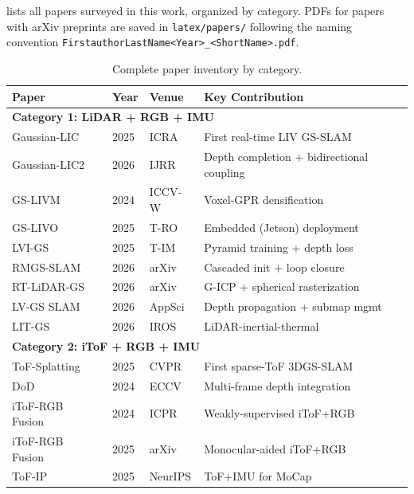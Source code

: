 lists all papers surveyed in this work, organized
by category.  PDFs for papers with arXiv preprints are saved in
\texttt{latex/papers/} following the naming convention
\texttt{FirstauthorLastName<Year>\_<ShortName>.pdf}.

\begin{table}[h]
\centering
\caption{Complete paper inventory by category.}
\label{tab:full_inventory}
\scriptsize
\begin{tabular}{p{4cm}p{2cm}p{2cm}p{5cm}}
\toprule
\textbf{Paper} & \textbf{Year} & \textbf{Venue} & \textbf{Key Contribution} \\
\midrule
\multicolumn{4}{l}{\textbf{Category 1: LiDAR + RGB + IMU}} \\
\midrule
Gaussian-LIC~\cite{lang2025_gaussianlic} & 2025 & ICRA & First real-time LIV GS-SLAM \\
Gaussian-LIC2~\cite{lang2026_gaussianlic2} & 2026 & IJRR & Depth completion + bidirectional coupling \\
GS-LIVM~\cite{xie2024_gslivm} & 2024 & ICCV-W & Voxel-GPR densification \\
GS-LIVO~\cite{hong2025_gslivo} & 2025 & T-RO & Embedded (Jetson) deployment \\
LVI-GS~\cite{zhao2025_lvigs} & 2025 & T-IM & Pyramid training + depth loss \\
RMGS-SLAM~\cite{li2026_rmgs} & 2026 & arXiv & Cascaded init + loop closure \\
RT-LiDAR-GS~\cite{tak2026_realtimelidar} & 2026 & arXiv & G-ICP + spherical rasterization \\
LV-GS SLAM~\cite{he2026lvgsslam} & 2026 & AppSci & Depth propagation + submap mgmt \\
LIT-GS~\cite{shi2026_litgs} & 2026 & IROS & LiDAR-inertial-thermal \\
\midrule
\multicolumn{4}{l}{\textbf{Category 2: iToF + RGB + IMU}} \\
\midrule
ToF-Splatting~\cite{conti2025_tofsplatting} & 2025 & CVPR & First sparse-ToF 3DGS-SLAM \\
DoD~\cite{conti2024_dod} & 2024 & ECCV & Multi-frame depth integration \\
iToF-RGB Fusion~\cite{fang2025_iToFRGB} & 2024 & ICPR & Weakly-supervised iToF+RGB \\
iToF-RGB Fusion~\cite{du2025_iToFRGB} & 2025 & arXiv & Monocular-aided iToF+RGB \\
ToF-IP~\cite{yao2025_tofip} & 2025 & NeurIPS & ToF+IMU for MoCap \\

\end{tabular}
\end{table}
